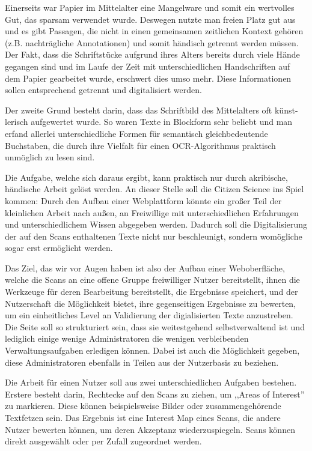 \documentclass{article}
\begin{document}
Einerseits war Papier im Mittelalter eine Mangelware und somit ein wertvolles Gut, das sparsam verwendet wurde.
Deswegen nutzte man freien Platz gut aus und es gibt Passagen,
die nicht in einen gemeinsamen zeitlichen Kontext gehören (z.B. nachträgliche Annotationen) und somit händisch getrennt werden müssen.
Der Fakt, dass die Schriftstücke aufgrund ihres Alters bereits durch viele Hände gegangen sind und im Laufe der Zeit
mit unterschiedlichen Handschriften auf dem Papier gearbeitet wurde, erschwert dies umso mehr.
Diese Informationen sollen entsprechend getrennt und digitalisiert werden.

Der zweite Grund besteht darin, dass das Schriftbild des Mittelalters oft künst-lerisch aufgewertet wurde.
So waren Texte in Blockform sehr beliebt und man erfand allerlei unterschiedliche Formen für semantisch gleichbedeutende Buchstaben,
die durch ihre Vielfalt für einen OCR-Algorithmus praktisch unmöglich zu lesen sind.

Die Aufgabe, welche sich daraus ergibt, kann praktisch nur durch akribische, händische Arbeit gelöst werden.
An dieser Stelle soll die Citizen Science ins Spiel kommen:
Durch den Aufbau einer Webplattform könnte ein großer Teil der kleinlichen Arbeit nach außen,
an Freiwillige mit unterschiedlichen Erfahrungen und unterschiedlichem Wissen abgegeben werden.
Dadurch soll die Digitalisierung der auf den Scans enthaltenen Texte nicht nur beschleunigt, sondern womögliche sogar erst ermöglicht werden.

Das Ziel, das wir vor Augen haben ist also der Aufbau einer Weboberfläche, welche die Scans an eine offene Gruppe freiwilliger Nutzer bereitstellt,
ihnen die Werkzeuge für deren Bearbeitung bereitstellt, die Ergebnisse speichert, und der Nutzerschaft die Möglichkeit bietet,
ihre gegenseitigen Ergebnisse zu bewerten, um ein einheitliches Level an Validierung der digialisierten Texte anzustreben.
Die Seite soll so strukturiert sein, dass sie weitestgehend selbstverwaltend ist und lediglich einige wenige Administratoren
die wenigen verbleibenden Verwaltungsaufgaben erledigen können.
Dabei ist auch die Möglichkeit gegeben, diese Administratoren ebenfalls in Teilen aus der Nutzerbasis zu beziehen.

Die Arbeit für einen Nutzer soll aus zwei unterschiedlichen Aufgaben bestehen.
Erstere besteht darin, Rechtecke auf den Scans zu ziehen, um ,,Areas of Interest'' zu markieren.
Diese können beispielsweise Bilder oder zusammengehörende Textfetzen sein.
Das Ergebnis ist eine Interest Map eines Scans, die andere Nutzer bewerten können, um deren Akzeptanz wiederzuspiegeln.
Scans können direkt ausgewählt oder per Zufall zugeordnet werden.
\end{document}
